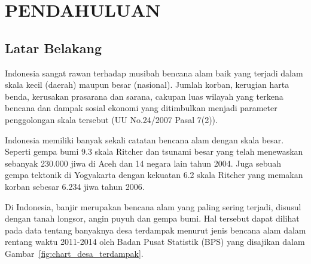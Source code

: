 
\chapter{PENDAHULUAN}  %

\ifpdf
    \graphicspath{{Chapter1/Figs/Raster/}{Chapter1/Figs/PDF/}{Chapter1/Figs/}}
\else
    \graphicspath{{Chapter1/Figs/Vector/}{Chapter1/Figs/}}
\fi


\section{Latar Belakang} %


Indonesia sangat rawan terhadap musibah bencana alam baik yang terjadi dalam skala kecil (daerah) maupun besar (nasional). Jumlah korban, kerugian harta benda, kerusakan prasarana dan sarana, cakupan luas wilayah yang terkena bencana dan dampak sosial ekonomi yang ditimbulkan menjadi parameter penggolongan skala tersebut (UU No.24/2007 Pasal 7(2)). 

Indonesia memiliki banyak sekali catatan bencana alam dengan skala besar. Seperti gempa bumi 9.3 skala Ritcher dan tsunami besar yang telah menewaskan sebanyak 230.000 jiwa di Aceh dan 14 negara lain tahun 2004. Juga sebuah gempa tektonik di Yogyakarta dengan kekuatan 6.2 skala Ritcher yang memakan korban sebesar 6.234 jiwa tahun 2006.

Di Indonesia, banjir merupakan bencana alam yang paling sering terjadi, disusul dengan tanah longsor, angin puyuh dan gempa bumi. Hal tersebut dapat dilihat pada data tentang banyaknya desa terdampak menurut jenis bencana alam dalam rentang waktu 2011-2014 oleh Badan Pusat Statistik (BPS) yang disajikan dalam Gambar~\ref{fig:chart_desa_terdampak}.


